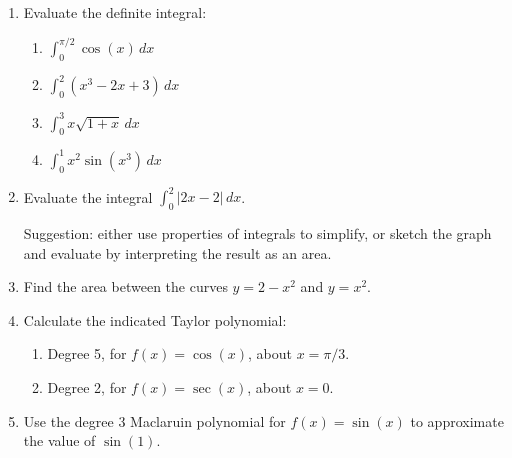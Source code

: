 \documentclass[12pt]{article}
\newcommand{\di}{\displaystyle}
\newcommand{\abs}[1]{\lvert #1\rvert}
\begin{document}
\begin{enumerate}
\item Evaluate the definite integral:
\begin{enumerate}
\item $\di \int_0^{\pi/2}\cos(x)\,dx$

\vspace{1in}

\item $\di \int_0^2(x^3-2x+3)\,dx$

\vspace{2in}

\item $\di \int_0^3 x\sqrt{1+x}\,dx$

\vspace{2in}

\item $\di \int_0^1 x^2\sin(x^3)\,dx$
\end{enumerate}

\newpage

\item Evaluate the integral $\di \int_0^2 \abs{2x-2}\,dx$.
 
\noindent Suggestion: either use properties of integrals to simplify, or sketch the graph and evaluate by interpreting the result as an area.

\vspace{7cm}

 \item Find the area between the curves $y= 2-x^2$ and $y=x^2$.

\newpage

\item Calculate the indicated Taylor polynomial:
\begin{enumerate}
\item Degree 5, for $f(x)=\cos(x)$, about $x=\pi/3$.

\vspace{2.5in}

\item Degree 2, for $f(x)=\sec(x)$, about $x=0$.
\end{enumerate}

\vspace{2.25in}

\item Use the degree 3 Maclaruin polynomial for $f(x)=\sin(x)$ to approximate the value of $\sin(1)$.
\end{enumerate}
\end{document}
